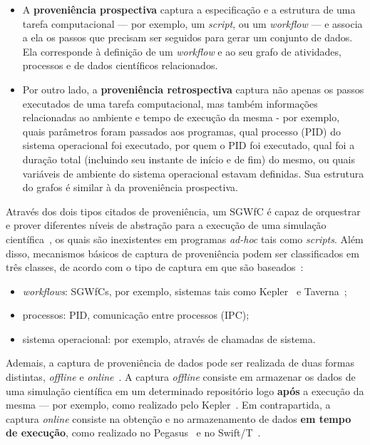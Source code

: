 \begin{itemize}
    \item A \textbf{proveniência prospectiva} captura a especificação e a estrutura de uma tarefa computacional --- por exemplo, um \textit{script}, ou um \textit{workflow} --- e associa a ela os passos que precisam ser seguidos para gerar um conjunto de dados. Ela corresponde à definição de um \textit{workflow} e ao seu grafo de atividades, processos e de dados científicos relacionados.
    \item Por outro lado, a \textbf{proveniência retrospectiva} captura não apenas os passos executados de uma tarefa computacional, mas também informações relacionadas ao ambiente e tempo de execução da mesma - por exemplo, quais parâmetros foram passados aos programas, qual  processo (PID) do sistema operacional foi executado, por quem o PID foi executado, qual foi a duração total (incluindo seu instante de início e de fim) do mesmo, ou quais variáveis de ambiente do sistema operacional estavam definidas. Sua estrutura do grafos é similar à da proveniência prospectiva.
\end{itemize}

Através dos dois tipos citados de proveniência, um SGWfC é capaz de orquestrar e prover diferentes níveis de abstração para a execução de uma simulação científica~\cite{murta2014noworkflow}, os quais são inexistentes em programas \textit{ad-hoc} tais como \textit{scripts}. Além disso, mecanismos básicos de captura de proveniência podem ser classificados em três classes, de acordo com o tipo de captura em que são baseados~\cite{freire2008provenance}:

\begin{itemize}
    \item \textit{workflows}: SGWfCs, por exemplo, sistemas tais como Kepler~\cite{ludascher2006scientific} e Taverna~\cite{hull2006taverna};
    \item processos: PID, comunicação entre processos (IPC);
    \item sistema operacional: por exemplo, através de chamadas de sistema.
\end{itemize}

Ademais, a captura de proveniência de dados pode ser realizada de duas formas distintas, \textit{offline} e \textit{online}~\cite{silva2015propostadoutorado}. A captura \textit{offline} consiste em armazenar os dados de uma simulação científica em um determinado repositório logo \textbf{após} a execução da mesma --- por exemplo, como realizado pelo Kepler~\cite{ludascher2006scientific}. Em contrapartida, a captura \textit{online} consiste na obtenção e no armazenamento de dados \textbf{em tempo de execução}, como realizado no Pegasus~\cite{deelman2005pegasus} e no Swift/T~\cite{zhao2007swift}.


